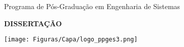 \begin{titlepage}



\begin{figure}[h]
{}
\qquad \quad \quad \quad \quad \quad \quad
{}
\qquad \quad \quad \quad \quad \quad \quad
{}
\end{figure}

\begin{center}

{\Large Programa de Pós-Graduação em Engenharia de Sistemas} \\ \vspace{1ex}

\vspace{1.0in}

{\Large \textbf{ DISSERTAÇÃO}}

\vspace{0.1in}

\texttt{[image: Figuras/Capa/logo\_ppges3.png]}

\vspace{1.3in}




\vspace{1.6in}

\dataQualif %


\end{center}
\end{titlepage} 